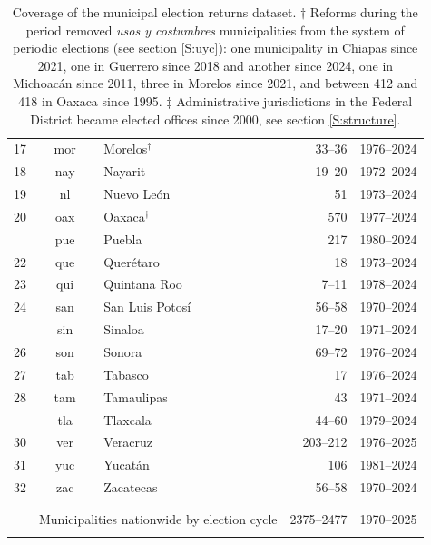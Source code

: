 \documentclass[letter,12pt]{article}
\newcommand{\mc}{\multicolumn}
\begin{document}
\begin{table}
{\begin{tabular}{rclrc}
      17 & mor & Morelos$^\dagger$                      &     33--36           & 1976--2024 \\
      18 & nay & Nayarit                               &     19--20           & 1972--2024 \\
      19 & nl  & Nuevo León                            &         51           & 1973--2024 \\
      20 & oax & Oaxaca$^\dagger$                       &        570           & 1977--2024 \\ \hdashline
      21 & pue & Puebla                                &        217           & 1980--2024 \\
      22 & que & Querétaro                             &         18           & 1973--2024 \\
      23 & qui & Quintana Roo                          &      7--11           & 1978--2024 \\
      24 & san & San Luis Potosí                       &     56--58           & 1970--2024 \\ \hdashline
      25 & sin & Sinaloa                               &     17--20           & 1971--2024 \\
      26 & son & Sonora                                &     69--72           & 1976--2024 \\
      27 & tab & Tabasco                               &         17           & 1976--2024 \\
      28 & tam & Tamaulipas                            &         43           & 1971--2024 \\ \hdashline
      29 & tla & Tlaxcala                              &     44--60           & 1979--2024 \\
      30 & ver & Veracruz                              &   203--212           & 1976--2025 \\
      31 & yuc & Yucatán                               &        106           & 1981--2024 \\
      32 & zac & Zacatecas                             &     56--58           & 1970--2024 \\
      \\ [-1.8ex] \hline
      \\ [-1.8ex] 
         & \mc{2}{l}{Municipalities nationwide by election cycle} & 2375--2477 & 1970--2025 \\
      \\ [-1.8ex] \hline

    \end{tabular}
}
\caption{Coverage of the municipal election returns dataset. $\dagger$ Reforms during the period removed \emph{usos y costumbres} municipalities from the system of periodic elections (see section \ref{S:uyc}): one municipality in Chiapas since 2021, one in Guerrero since 2018 and another since 2024, one in Michoacán since 2011, three in Morelos since 2021, and between 412 and 418 in Oaxaca since 1995. $\ddagger$ Administrative jurisdictions in the Federal District became elected offices since 2000, see section \ref{S:structure}.}\label{T:coverage}
\end{table}
\end{document}
